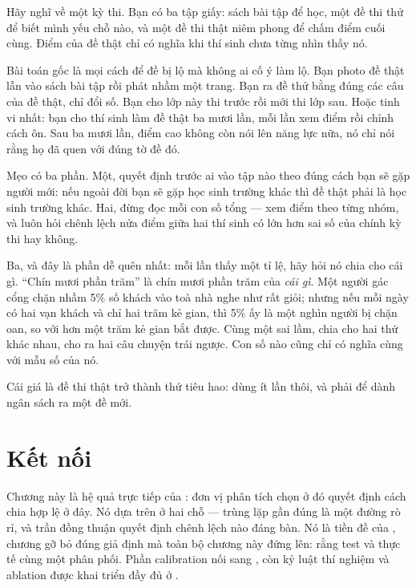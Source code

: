 \documentclass[../../deep_learning.tex]{subfiles}
\begin{document}
\begin{dongian}
Hãy nghĩ về một kỳ thi. Bạn có ba tập giấy: sách bài tập để học, một đề thi thử để biết mình yếu chỗ nào, và một đề thi thật niêm phong để chấm điểm cuối cùng. Điểm của đề thật chỉ có nghĩa khi thí sinh chưa từng nhìn thấy nó.

Bài toán gốc là mọi cách để đề bị lộ mà không ai cố ý làm lộ. Bạn photo đề thật lẫn vào sách bài tập rồi phát nhầm một trang. Bạn ra đề thử bằng đúng các câu của đề thật, chỉ đổi số. Bạn cho lớp này thi trước rồi mới thi lớp sau. Hoặc tinh vi nhất: bạn cho thí sinh làm đề thật ba mươi lần, mỗi lần xem điểm rồi chỉnh cách ôn. Sau ba mươi lần, điểm cao không còn nói lên năng lực nữa, nó chỉ nói rằng họ đã quen với đúng tờ đề đó.

Mẹo có ba phần. Một, quyết định trước ai vào tập nào theo đúng cách bạn sẽ gặp người mới: nếu ngoài đời bạn sẽ gặp học sinh trường khác thì đề thật phải là học sinh trường khác. Hai, đừng đọc mỗi con số tổng --- xem điểm theo từng nhóm, và luôn hỏi chênh lệch nửa điểm giữa hai thí sinh có lớn hơn sai số của chính kỳ thi hay không.

Ba, và đây là phần dễ quên nhất: mỗi lần thấy một tỉ lệ, hãy hỏi nó chia cho cái gì. ``Chín mươi phần trăm'' là chín mươi phần trăm của \emph{cái gì}. Một người gác cổng chặn nhầm 5\% số khách vào toà nhà nghe như rất giỏi; nhưng nếu mỗi ngày có hai vạn khách và chỉ hai trăm kẻ gian, thì 5\% ấy là một nghìn người bị chặn oan, so với hơn một trăm kẻ gian bắt được. Cùng một sai lầm, chia cho hai thứ khác nhau, cho ra hai câu chuyện trái ngược. Con số nào cũng chỉ có nghĩa cùng với mẫu số của nó.

Cái giá là đề thi thật trở thành thứ tiêu hao: dùng ít lần thôi, và phải để dành ngân sách ra một đề mới.

\end{dongian}

\section{Kết nối}
Chương này là hệ quả trực tiếp của : đơn vị phân tích chọn ở đó quyết định cách chia hợp lệ ở đây. Nó dựa trên  ở hai chỗ --- trùng lặp gần đúng là một đường rò rỉ, và trần đồng thuận quyết định chênh lệch nào đáng bàn. Nó là tiền đề của , chương gỡ bỏ đúng giả định mà toàn bộ chương này đứng lên: rằng test và thực tế cùng một phân phối. Phần calibration nối sang , còn kỷ luật thí nghiệm và ablation được khai triển đầy đủ ở .
\end{document}
